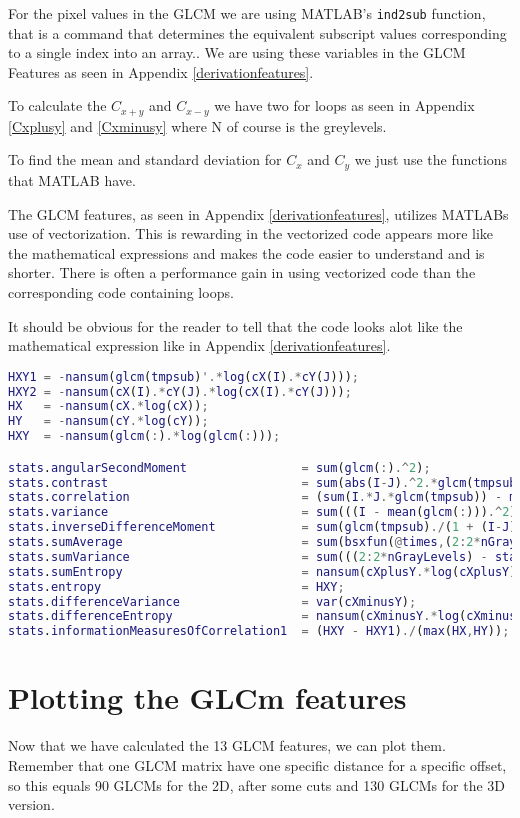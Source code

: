 For the pixel values in the GLCM we are using MATLAB's \texttt{ind2sub} function, that is a command that determines the equivalent subscript values corresponding to a single index into an array.. We are using these variables in the GLCM Features as seen in Appendix \ref{derivationfeatures}.

To calculate the $C_{x+y}$ and $C_{x-y}$ we have two for loops as seen in Appendix \ref{Cxplusy} and \ref{Cxminusy} where N of course is the greylevels.

To find the mean and standard deviation for $C_x$ and $C_y$ we just use the functions that MATLAB have.

The GLCM features, as seen in Appendix \ref{derivationfeatures}, utilizes MATLABs use of vectorization. This is rewarding in the vectorized code appears more like the mathematical expressions and makes the code easier to understand and is shorter. There is often a performance gain in using vectorized code than the corresponding code containing loops.

It should be obvious for the reader to tell that the code looks alot like the mathematical expression like in Appendix \ref{derivationfeatures}.

\begin{lstlisting}[language=Matlab]
HXY1 = -nansum(glcm(tmpsub)'.*log(cX(I).*cY(J)));
HXY2 = -nansum(cX(I).*cY(J).*log(cX(I).*cY(J)));
HX   = -nansum(cX.*log(cX));
HY   = -nansum(cY.*log(cY));
HXY  = -nansum(glcm(:).*log(glcm(:)));

stats.angularSecondMoment                = sum(glcm(:).^2);
stats.contrast                           = sum(abs(I-J).^2.*glcm(tmpsub));
stats.correlation                        = (sum(I.*J.*glcm(tmpsub)) - muX*muY) ./ (stdX*stdY);
stats.variance                           = sum(((I - mean(glcm(:))).^2).*glcm(tmpsub));
stats.inverseDifferenceMoment            = sum(glcm(tmpsub)./(1 + (I-J).^2));
stats.sumAverage                         = sum(bsxfun(@times,(2:2*nGrayLevels)',cXplusY));
stats.sumVariance                        = sum(((2:2*nGrayLevels) - stats.sumAverage)'.^2.*cXplusY((2:2*nGrayLevels)-1,1));
stats.sumEntropy                         = nansum(cXplusY.*log(cXplusY));
stats.entropy                            = HXY;
stats.differenceVariance                 = var(cXminusY);
stats.differenceEntropy                  = nansum(cXminusY.*log(cXminusY));
stats.informationMeasuresOfCorrelation1  = (HXY - HXY1)./(max(HX,HY));
\end{lstlisting}


\section{Plotting the GLCm features}
Now that we have calculated the 13 GLCM features, we can plot them. Remember that one GLCM matrix have one specific distance for a specific offset, so this equals 90 GLCMs for the 2D, after some cuts and 130 GLCMs for the 3D version.


